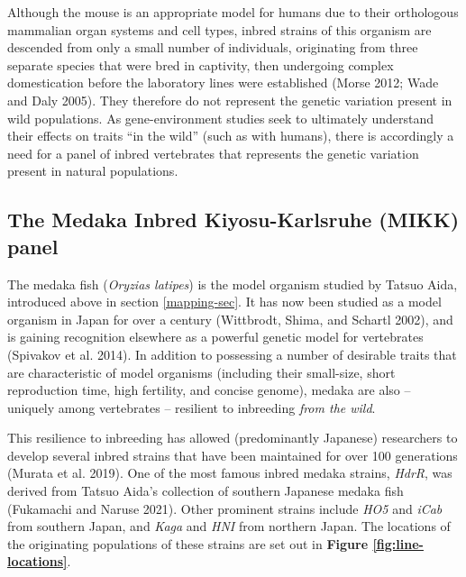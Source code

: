 \documentclass[
]{book}
\begin{document}
Although the mouse is an appropriate model for humans due to their orthologous mammalian organ systems and cell types, inbred strains of this organism are descended from only a small number of individuals, originating from three separate species that were bred in captivity, then undergoing complex domestication before the laboratory lines were established (Morse 2012; Wade and Daly 2005). They therefore do not represent the genetic variation present in wild populations. As gene-environment studies seek to ultimately understand their effects on traits ``in the wild'' (such as with humans), there is accordingly a need for a panel of inbred vertebrates that represents the genetic variation present in natural populations.

\hypertarget{MIKK-background}{%
\subsection{The Medaka Inbred Kiyosu-Karlsruhe (MIKK) panel}\label{MIKK-background}}

The medaka fish (\emph{Oryzias latipes}) is the model organism studied by Tatsuo Aida, introduced above in section \ref{mapping-sec}. It has now been studied as a model organism in Japan for over a century (Wittbrodt, Shima, and Schartl 2002), and is gaining recognition elsewhere as a powerful genetic model for vertebrates (Spivakov et al. 2014). In addition to possessing a number of desirable traits that are characteristic of model organisms (including their small-size, short reproduction time, high fertility, and concise genome), medaka are also -- uniquely among vertebrates -- resilient to inbreeding \emph{from the wild}.

This resilience to inbreeding has allowed (predominantly Japanese) researchers to develop several inbred strains that have been maintained for over 100 generations (Murata et al. 2019). One of the most famous inbred medaka strains, \emph{HdrR}, was derived from Tatsuo Aida's collection of southern Japanese medaka fish (Fukamachi and Naruse 2021). Other prominent strains include \emph{HO5} and \emph{iCab} from southern Japan, and \emph{Kaga} and \emph{HNI} from northern Japan. The locations of the originating populations of these strains are set out in \textbf{Figure \ref{fig:line-locations}}.
\end{document}
